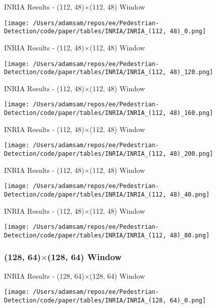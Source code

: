 \begin{table}
    \caption{INRIA Results - (112, 48)$\times$(112, 48) Window}
    \texttt{[image: /Users/adamsam/repos/ee/Pedestrian-Detection/code/paper/tables/INRIA/INRIA\_(112, 48)\_0.png]}
    \label{tab:INRIA_(112, 48)_0}
\end{table}

\begin{table}
    \caption{INRIA Results - (112, 48)$\times$(112, 48) Window}
    \texttt{[image: /Users/adamsam/repos/ee/Pedestrian-Detection/code/paper/tables/INRIA/INRIA\_(112, 48)\_120.png]}
    \label{tab:INRIA_(112, 48)_120}
\end{table}

\begin{table}
    \caption{INRIA Results - (112, 48)$\times$(112, 48) Window}
    \texttt{[image: /Users/adamsam/repos/ee/Pedestrian-Detection/code/paper/tables/INRIA/INRIA\_(112, 48)\_160.png]}
    \label{tab:INRIA_(112, 48)_160}
\end{table}

\begin{table}
    \caption{INRIA Results - (112, 48)$\times$(112, 48) Window}
    \texttt{[image: /Users/adamsam/repos/ee/Pedestrian-Detection/code/paper/tables/INRIA/INRIA\_(112, 48)\_200.png]}
    \label{tab:INRIA_(112, 48)_200}
\end{table}

\begin{table}
    \caption{INRIA Results - (112, 48)$\times$(112, 48) Window}
    \texttt{[image: /Users/adamsam/repos/ee/Pedestrian-Detection/code/paper/tables/INRIA/INRIA\_(112, 48)\_40.png]}
    \label{tab:INRIA_(112, 48)_40}
\end{table}

\begin{table}
    \caption{INRIA Results - (112, 48)$\times$(112, 48) Window}
    \texttt{[image: /Users/adamsam/repos/ee/Pedestrian-Detection/code/paper/tables/INRIA/INRIA\_(112, 48)\_80.png]}
    \label{tab:INRIA_(112, 48)_80}
\end{table}

\subsubsection*{(128, 64)$\times$(128, 64) Window}

\begin{table}
    \caption{INRIA Results - (128, 64)$\times$(128, 64) Window}
    \texttt{[image: /Users/adamsam/repos/ee/Pedestrian-Detection/code/paper/tables/INRIA/INRIA\_(128, 64)\_0.png]}
    \label{tab:INRIA_(128, 64)_0}
\end{table}

